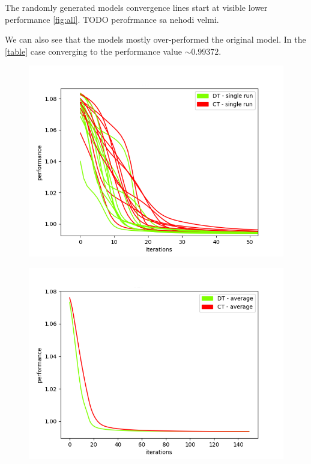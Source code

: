 \documentclass[thesis=M,english]{FITthesis}[2012/10/20]
\begin{document}
\begin{itemize}
The randomly generated models convergence lines start at visible lower performance \ref{fig:all}. TODO perofrmance sa nehodi velmi.

We can also see that the models mostly over-performed the original model. In the \ref{table} case converging to the performance value $\sim 0.99372$. 

\begin{figure}
\centering
\begin{minipage}{.8\textwidth}
  \centering
  \includegraphics[width=1\linewidth]{img/ex1/1/single_runs_zoom50.png}
  \label{fig:sr50}
\end{minipage}
\begin{minipage}{.8\textwidth}
  \centering
  \includegraphics[width=.95\linewidth]{img/ex1/1/average.png}
  \label{fig:avgc}
\end{minipage}
\end{figure} 


\end{itemize}
\end{document}
